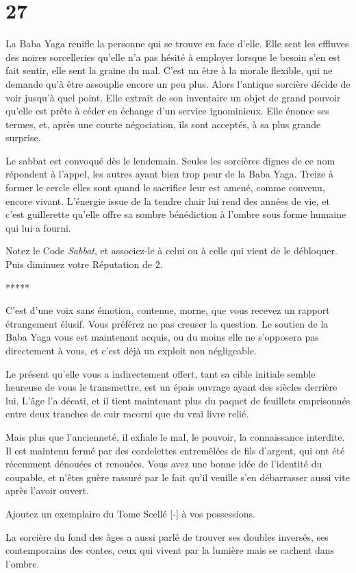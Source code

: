 \documentclass{report}
\newcommand{\gsection}[1]{
    \section{#1}
    \label{section-#1}
}
\newcommand{\ellipse}{
    \begin{center}
        *****
    \end{center}
}
\begin{document}
\gsection{27}

La Baba Yaga renifle la personne qui se trouve en face d'elle. Elle sent les effluves des noires sorcelleries qu'elle n'a pas hésité à employer lorsque le besoin s'en est fait sentir, elle sent la graine du mal. C'est un être à la morale flexible, qui ne demande qu'à être assouplie encore un peu plus. Alors l'antique sorcière décide de voir jusqu'à quel point. Elle extrait de son inventaire un objet de grand pouvoir qu'elle est prête à céder en échange d'un service ignominieux. Elle énonce ses termes, et, après une courte négociation, ils sont acceptés, à sa plus grande surprise.

Le sabbat est convoqué dès le lendemain. Seules les sorcières dignes de ce nom répondent à l'appel, les autres ayant bien trop peur de la Baba Yaga. Treize à former le cercle elles sont quand le sacrifice leur est amené, comme convenu, encore vivant. L'énergie issue de la tendre chair lui rend des années de vie, et c'est guillerette qu'elle offre sa sombre bénédiction à l'ombre sous forme humaine qui lui a fourni.

Notez le Code \emph{Sabbat}, et associez-le à celui ou à celle qui vient de le débloquer. Puis diminuez votre Réputation de 2.

\ellipse

C'est d'une voix sans émotion, contenue, morne, que vous recevez un rapport étrangement élusif. Vous préférez ne pas creuser la question. Le soutien de la Baba Yaga vous est maintenant acquis, ou du moins elle ne s'opposera pas directement à vous, et c'est déjà un exploit non négligeable.

Le présent qu'elle vous a indirectement offert, tant sa cible initiale semble heureuse de vous le transmettre, est un épais ouvrage ayant des siècles derrière lui. L'âge l'a décati, et il tient maintenant plus du paquet de feuillets emprisonnés entre deux tranches de cuir racorni que du vrai livre relié.

Mais plus que l'ancienneté, il exhale le mal, le pouvoir, la connaissance interdite. Il est maintenu fermé par des cordelettes entremêlées de fils d'argent, qui ont été récemment dénouées et renouées. Vous avez une bonne idée de l'identité du coupable, et n'êtes guère rassuré par le fait qu'il veuille s'en débarrasser aussi vite après l'avoir ouvert.

Ajoutez un exemplaire du Tome Scellé [-] à vos possessions.

La sorcière du fond des âges a aussi parlé de trouver ses doubles inversés, ses contemporains des contes, ceux qui vivent par la lumière mais se cachent dans l'ombre.
\end{document}
